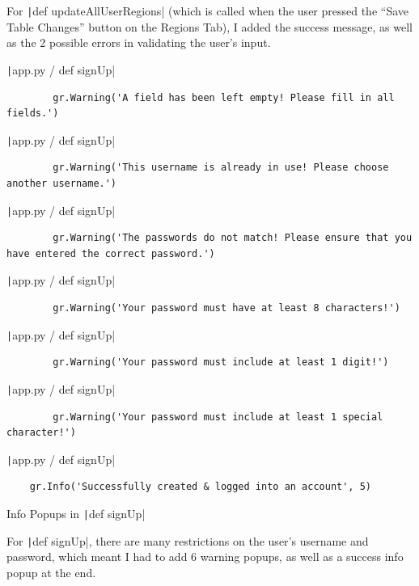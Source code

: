 \documentclass[12pt]{report}
\newcommand{\pil}[1]{\protect\texttt|#1|}
\begin{document}
For \pil{def updateAllUserRegions} (which is called when the user pressed the ``Save Table Changes'' button on the Regions Tab), I added the success message, as well as the 2 possible errors in validating the user's input.

\begin{listing}[H]
\pil{app.py / def signUp}
\begin{verbatim}
        gr.Warning('A field has been left empty! Please fill in all fields.')
\end{verbatim}
\pil{app.py / def signUp}
\begin{verbatim}
        gr.Warning('This username is already in use! Please choose another username.')
\end{verbatim}
\pil{app.py / def signUp}
\begin{verbatim}
        gr.Warning('The passwords do not match! Please ensure that you have entered the correct password.')
\end{verbatim}
\pil{app.py / def signUp}
\begin{verbatim}
        gr.Warning('Your password must have at least 8 characters!')
\end{verbatim}
\pil{app.py / def signUp}
\begin{verbatim}
        gr.Warning('Your password must include at least 1 digit!')
\end{verbatim}
\pil{app.py / def signUp}
\begin{verbatim}
        gr.Warning('Your password must include at least 1 special character!')
\end{verbatim}
\pil{app.py / def signUp}
\begin{verbatim}
    gr.Info('Successfully created & logged into an account', 5)
\end{verbatim}
\caption{Info Popups in \pil{def signUp}}\label{cs:infoPopups6}
\end{listing}

For \pil{def signUp}, there are many restrictions on the user's username and password, which meant I had to add 6 warning popups, as well as a success info popup at the end.
\end{document}
